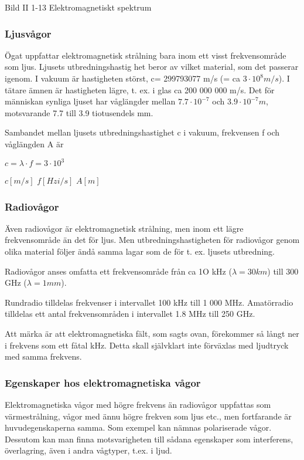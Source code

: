 Bild II 1-13 Elektromagnetiskt spektrum

\subsubsection{Ljusvågor}

Ögat uppfattar elektromagnetisk strålning bara inom ett visst frekvensområde som ljus.
Ljusets utbredningshastig het beror av vilket material, som det passerar igenom. I
vakuum är hastigheten störst, c= 299793077 m/s (= ca $3 \cdot 10^8 m/s$). I tätare ämnen är
hastigheten lägre, t. ex. i glas ca 200 000 000 m/s. Det för människan synliga ljuset har
våglängder mellan $7.7 \cdot 10^{-7}$ och $3.9 \cdot 10^{-7} m$, motsvarande 7.7 till 3.9
tiotusendels mm.

Sambandet mellan ljusets utbredningshastighet c i vakuum, frekvensen f och våglängden A är

$c = \lambda \cdot f = 3 \cdot 10^3$

$c [m/s]$ $f [Hz  i/s]$ $A [m]$

\subsubsection{Radiovågor}

Även radiovågor är elektromagnetisk strålning, men inom ett lägre frekvensområde än
det för ljus. Men utbredningshastigheten för radiovågor genom olika material följer ändå
samma lagar som de för t. ex. ljusets utbredning.

Radiovågor anses omfatta ett frekvensområde från ca 1O kHz ($\lambda = 30 km$) till 300
GHz ($\lambda = 1 mm$).

Rundradio tilldelas frekvenser i intervallet 100 kHz till 1 000 MHz. Amatörradio tilldelas
ett antal frekvensområden i intervallet 1.8 MHz till 250 GHz.

Att märka är att elektromagnetiska fält, som sagts ovan, förekommer så långt ner i
frekvens som ett fåtal kHz. Detta skall självklart inte förväxlas med ljudtryck med samma
frekvens.

\subsubsection{Egenskaper hos elektromagnetiska vågor}

Elektromagnetiska vågor med högre frekvens än radiovågor uppfattas som värmestrålning,
vågor med ännu högre frekven som ljus etc., men fortfarande är huvudegenskaperna samma.
Som exempel kan nämnas polariserade vågor. Dessutom kan
man finna motsvarigheten till sådana egenskaper som interferens, överlagring, även i
andra vågtyper, t.ex. i ljud.

